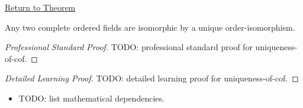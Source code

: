 \newpage
{}
\label{prf:uniqueness-of-cof}

\begin{remark*}[Return]
\hyperref[thm:uniqueness-of-cof]{Return to Theorem}
\end{remark*}

\begin{theorem*}
Any two complete ordered fields are isomorphic by a unique order-isomorphism.
\end{theorem*}

\begin{proof}[Professional Standard Proof]
\LRAProofBodyStart
TODO: professional standard proof for uniqueness-of-cof.
\end{proof}

\begin{proof}[Detailed Learning Proof]
\LRAProofBodyStart
TODO: detailed learning proof for uniqueness-of-cof.
\end{proof}

\begin{remark*}
\end{remark*}

\begin{dependencies}
\begin{itemize}
  \item TODO: list mathematical dependencies.
\end{itemize}
\end{dependencies}

\clearpage
